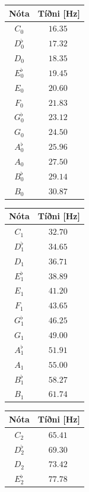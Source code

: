 \ifdefined \wholebook \else\documentclass[oneside]{book}\usepackage{EdlBook}\graphicspath{{figures/}}
\begin{document}
\begin{table}[H]
\begin{center}
\begin{tabular}{|c|c|}
\hline
\textbf{Nóta} & \textbf{Tíðni [Hz]} \\
\hline
\hline
$C_0$ & $\SI{16.35}{}$ \\
$D^\flat_0$ & $\SI{17.32}{}$ \\
$D_0$ & $\SI{18,35}{}$ \\
$E^\flat_0$ & $\SI{19,45}{}$ \\
$E_0$ & $\SI{20.60}{}$ \\
$F_0$ & $\SI{21,83}{}$ \\
$G^\flat_0$ & $\SI{23,12}{}$ \\
$G_0$ & $\SI{24,50}{}$ \\
$A^\flat_0$ & $\SI{25,96}{}$ \\
$A_0$ & $\SI{27,50}{}$ \\
$B^\flat_0$ & $\SI{29,14}{}$ \\
$B_0$ & $\SI{30,87}{}$ \\
\hline
\end{tabular}
\quad
\begin{tabular}{|c|c|}
\hline
\textbf{Nóta} & \textbf{Tíðni [Hz]} \\
\hline
\hline
$C_1$ & $\SI{32.70}{}$ \\
$D^\flat_1$ & $\SI{34.65}{}$ \\
$D_1$ & $\SI{36.71}{}$ \\
$E^\flat_1$ & $\SI{38.89}{}$ \\
$E_1$ & $\SI{41.20}{}$ \\
$F_1$ & $\SI{43.65}{}$ \\
$G^\flat_1$ & $\SI{46.25}{}$ \\
$G_1$ & $\SI{49.00}{}$ \\
$A^\flat_1$ & $\SI{51.91}{}$ \\
$A_1$ & $\SI{55.00}{}$ \\
$B^\flat_1$ & $\SI{58.27}{}$ \\
$B_1$ & $\SI{61.74}{}$ \\
\hline
\end{tabular}
\quad
\begin{tabular}{|c|c|}
\hline
\textbf{Nóta} & \textbf{Tíðni [Hz]} \\
\hline
\hline
$C_2$ & $\SI{65.41}{}$ \\
$D^\flat_2$ & $\SI{69.30}{}$ \\
$D_2$ & $\SI{73.42}{}$ \\
$E^\flat_2$ & $\SI{77.78}{}$ \\

\end{tabular}
\end{center}
\end{table}
\end{document}
